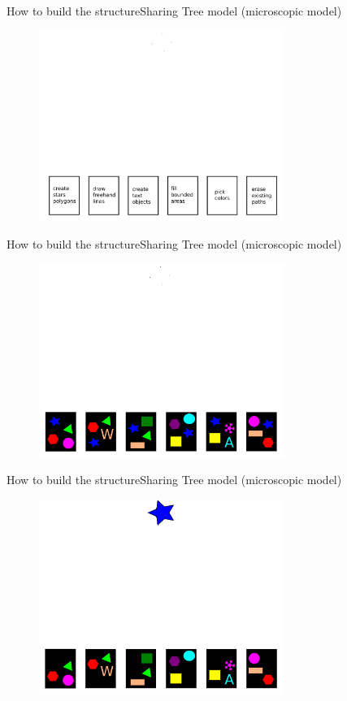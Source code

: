 \documentclass[11pt,svgnames]{beamer}
\begin{document}
\begin{frame}{How to build the structure}{Sharing Tree model (microscopic model)}
\begin{figure}[p]%
\center
\includegraphics[width=8cm,draft=false]{immagini/a1.pdf}
\end{figure}
\end{frame}
\begin{frame}[noframenumbering]{How to build the structure}{Sharing Tree model (microscopic model)}
\begin{figure}[p]%
\center
\includegraphics[width=8cm,draft=false]{immagini/a2.pdf}
\end{figure}
\end{frame}
\begin{frame}[noframenumbering]{How to build the structure}{Sharing Tree model (microscopic model)}
\begin{figure}[p]%
\center
\includegraphics[width=8cm,draft=false]{immagini/aa3.pdf}
\end{figure}
\end{frame}
\end{document}
